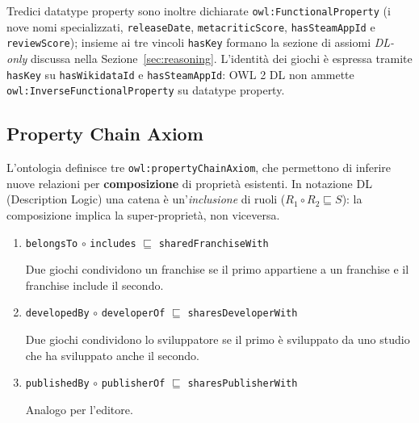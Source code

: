 Tredici datatype property sono inoltre dichiarate \texttt{owl:FunctionalProperty}
(i nove nomi specializzati, \texttt{releaseDate}, \texttt{metacriticScore},
\texttt{hasSteamAppId} e \texttt{reviewScore}); insieme ai tre vincoli \texttt{hasKey}
formano la sezione di assiomi \emph{DL-only} discussa nella Sezione~\ref{sec:reasoning}.
L'identit\`a dei giochi \`e espressa tramite \texttt{hasKey} su \texttt{hasWikidataId} e
\texttt{hasSteamAppId}: OWL 2 DL non ammette \texttt{owl:InverseFunctionalProperty} su
datatype property.

\subsection{Property Chain Axiom}\label{sec:chains}

L'ontologia definisce tre \texttt{owl:propertyChainAxiom}, che permettono di
inferire nuove relazioni per \textbf{composizione} di propriet\`a esistenti.
In notazione DL (Description Logic) una catena \`e un'\emph{inclusione} di ruoli
($R_1 \circ R_2 \sqsubseteq S$): la composizione implica la super-propriet\`a, non viceversa.

\begin{enumerate}[nosep]
  \item \texttt{belongsTo} $\circ$ \texttt{includes} $\sqsubseteq$ \texttt{sharedFranchiseWith}

    Due giochi condividono un franchise se il primo appartiene a un franchise
    e il franchise include il secondo.
  \item \texttt{developedBy} $\circ$ \texttt{developerOf} $\sqsubseteq$ \texttt{sharesDeveloperWith}

    Due giochi condividono lo sviluppatore se il primo \`e sviluppato da uno
    studio che ha sviluppato anche il secondo.
  \item \texttt{publishedBy} $\circ$ \texttt{publisherOf} $\sqsubseteq$ \texttt{sharesPublisherWith}

    Analogo per l'editore.
\end{enumerate}

